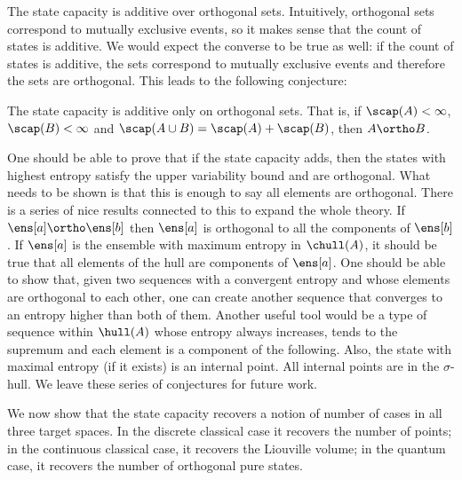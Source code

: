The state capacity is additive over orthogonal sets. Intuitively, orthogonal sets correspond to mutually exclusive events, so it makes sense that the count of states is additive. We would expect the converse to be true as well: if the count of states is additive, the sets correspond to mutually exclusive events and therefore the sets are orthogonal. This leads to the following conjecture:

\begin{conj}
	The state capacity is additive only on orthogonal sets. That is, if $\scap(A)<\infty$, $\scap(B)<\infty$ and $\scap(A \cup B) = \scap(A) +\scap(B)$, then $A \ortho B$.
\end{conj}

One should be able to prove that if the state capacity adds, then the states with highest entropy satisfy the upper variability bound and are orthogonal. What needs to be shown is that this is enough to say all elements are orthogonal. There is a series of nice results connected to this to expand the whole theory. If $\ens[a] \ortho \ens[b]$ then $\ens[a]$ is orthogonal to all the components of $\ens[b]$. If $\ens[a]$ is the ensemble with maximum entropy in $\chull(A)$, it should be true that all elements of the hull are components of $\ens[a]$. One should be able to show that, given two sequences with a convergent entropy and whose elements are orthogonal to each other, one can create another sequence that converges to an entropy higher than both of them. Another useful tool would be a type of sequence within $\hull(A)$ whose entropy always increases, tends to the supremum and each element is a component of the following. Also, the state with maximal entropy (if it exists) is an internal point. All internal points are in the $\sigma$-hull. We leave these series of conjectures for future work.

We now show that the state capacity recovers a notion of number of cases in all three target spaces. In the discrete classical case it recovers the number of points; in the continuous classical case, it recovers the Liouville volume; in the quantum case, it recovers the number of orthogonal pure states.

